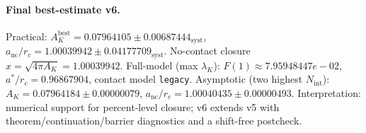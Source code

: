 \paragraph{Final best-estimate v6.}
Practical: $A_K^{\mathrm{best}} = 0.07964105 \pm 0.00687444_{\mathrm{syst}}$, $a_{\mathrm{nc}}/r_c = 1.00039942 \pm 0.04177709_{\mathrm{syst}}$.
No-contact closure $x = \sqrt{4\pi A_K} = 1.00039942$.
Full-model (max $\lambda_K$): $F(1) \approx 7.95948447e-02$, $a^*/r_c = 0.96867904$, contact model \texttt{legacy}.
Asymptotic (two highest $N_{\mathrm{int}}$): $A_K = 0.07964184 \pm 0.00000079$, $a_{\mathrm{nc}}/r_c = 1.00040435 \pm 0.00000493$.
Interpretation: numerical support for percent-level closure; v6 extends v5 with theorem/continuation/barrier diagnostics and a shift-free postcheck.
